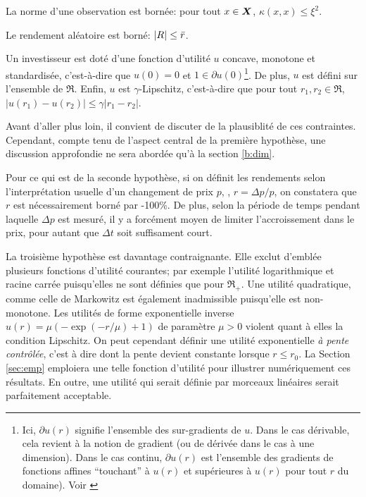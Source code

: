 \begin{assumption}
  La norme d'une observation est bornée: pour tout $x \in \bm{X}$, $\kappa(x,x) \leq \xi^2$.
\end{assumption}
\begin{assumption}
  Le rendement aléatoire est borné: $|R| \leq \bar r$.
\end{assumption}
\begin{assumption}
  \label{hyp:lip}
  Un investisseur est doté d'une fonction d'utilité $u$ concave, monotone et standardisée,
  c'est-à-dire que $u(0) = 0$ et $1 \in \partial u(0)$\footnote{Ici, $\partial u(r)$ signifie l'ensemble
    des sur-gradients de $u$. Dans le cas dérivable, cela revient à la notion de gradient
    (ou de dérivée dans le cas à une dimension). Dans le cas continu, $\partial u(r)$ est
    l'ensemble des gradients de fonctions affines ``touchant'' à $u(r)$ et supérieures à
    $u(r)$ pour tout $r$ du domaine). Voir
    \cite{boyd2004convex,rockafellar1970convex}}. De plus, $u$ est défini sur l'ensemble
  de $\Re$. Enfin, $u$ est $\gamma$-Lipschitz, c'est-à-dire que pour tout
  $r_1,r_2 \in \Re$, $|u(r_1) - u(r_2)| \leq \gamma|r_1-r_2|$.
\end{assumption}

Avant d'aller plus loin, il convient de discuter de la plausiblité de ces
contraintes. Cependant, compte tenu de l'aspect central de la première hypothèse, une
discussion approfondie ne sera abordée qu'à la section \ref{b:dim}.

Pour ce qui est de la seconde hypothèse, si on définit les rendements selon
l'interprétation usuelle d'un changement de prix $p$, \ie, $r = \Delta p/p$, on constatera que
$r$ est nécessairement borné par -100\%. De plus, selon la période de temps pendant laquelle
$\Delta p$ est mesuré, il y a forcément moyen de limiter l'accroissement dans le prix, pour
autant que $\Delta t$ soit suffisament court.

La troisième hypothèse est davantage contraignante. Elle exclut d'emblée plusieurs
fonctions d'utilité courantes; par exemple l'utilité logarithmique et racine carrée
puisqu'elles ne sont définies que pour $\Re_{+}$. Une utilité quadratique, comme celle de
Markowitz est également inadmissible puisqu'elle est non-monotone. Les utilités de forme
exponentielle inverse $u(r) = \mu(-\exp(-r/\mu)+1)$ de paramètre $\mu > 0$ violent quant à elles
la condition Lipschitz. On peut cependant définir une utilité exponentielle \textit{à
  pente contrôlée}, c'est à dire dont la pente devient constante lorsque $r \leq r_0$. La
Section \ref{sec:emp} emploiera une telle fonction d'utilité pour illustrer numériquement
ces résultats. En outre, une utilité qui serait définie par morceaux linéaires serait
parfaitement acceptable. 


